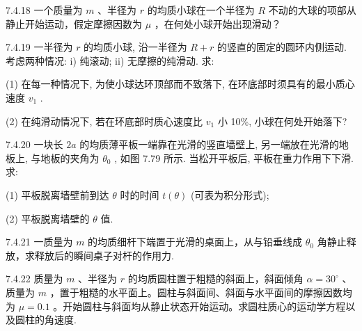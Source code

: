 \begin{problem}{7.4.18}
一个质量为 $m$ 、半径为 $r$ 的均质小球在一个半径为 $R$ 不动的大球的项部从静止开始运动，假定摩擦因数为 $\mu$ ，在何处小球开始出现滑动？
\end{problem}
\clearpage


\begin{problem}{7.4.19}
一半径为 $r$ 的均质小球, 沿一半径为 $R + r$ 的竖直的固定的圆环内侧运动. 考虑两种情况: i) 纯滚动; ii) 无摩擦的纯滑动. 求:

(1) 在每一种情况下, 为使小球达环顶部而不致落下, 在环底部时须具有的最小质心速度 $v_{1}$ .

(2) 在纯滑动情况下, 若在环底部时质心速度比 $v_{1}$ 小 10\%, 小球在何处开始落下?
\begin{center}

\end{center}
\end{problem}
\clearpage


\begin{problem}{7.4.20}
一块长 $2a$ 的均质薄平板一端靠在光滑的竖直墙壁上, 另一端放在光滑的地板上, 与地板的夹角为 $\theta_0$ , 如图 7.79 所示. 当松开平板后, 平板在重力作用下下滑. 求:

(1) 平板脱离墙壁前到达 $\theta$ 时的时间 $t(\theta)$ (可表为积分形式);

(2) 平板脱离墙壁的 $\theta$ 值.
\begin{center}

\end{center}
\end{problem}
\clearpage


\begin{problem}{7.4.21}
一质量为 $m$ 的均质细杆下端置于光滑的桌面上，从与铅垂线成 $\theta_0$ 角静止释放，求释放后的瞬间桌子对杆的作用力.
\begin{center}

\end{center}
\end{problem}
\clearpage


\begin{problem}{7.4.22}
质量为 $m$ 、半径为 $r$ 的均质圆柱置于粗糙的斜面上，斜面倾角 $\alpha = 30^{\circ}$ 、质量为 $m$ ，置于粗糙的水平面上。圆柱与斜面间、斜面与水平面间的摩擦因数均为 $\mu = 0.1$ 。开始圆柱与斜面均从静止状态开始运动。求圆柱质心的运动学方程以及圆柱的角速度.
\begin{center}

\end{center}
\end{problem}
\clearpage


